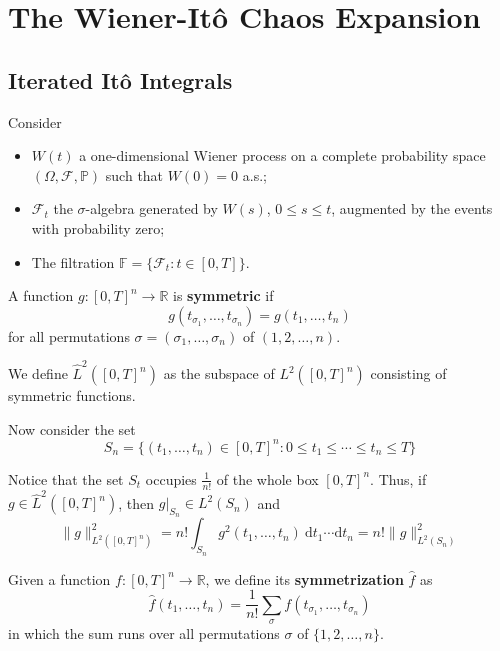 \chapter{The Wiener-Itô Chaos Expansion}

\section{Iterated Itô Integrals}

Consider

\begin{itemize}
\item
  \(W(t)\) a one-dimensional Wiener process on a complete probability
  space \((\Omega, \mathcal{F}, \mathbb{P})\) such that \(W(0) = 0\)
  a.s.;
\item
  \(\mathcal{F}_t\) the \(\sigma\)-algebra generated by \(W(s)\),
  \(0 \le s \le t\), augmented by the events with probability zero;
\item
  The filtration \(\mathbb{F} = \{ \mathcal{F}_t : t \in [0, T] \}\).
\end{itemize}

\begin{definition}
    A function \(g : [0,T]^n \longrightarrow \mathbb{R}\) is \textbf{symmetric} if
    \[
    g(t_{\sigma_1}, \ldots, t_{\sigma_n}) = g(t_1, \ldots, t_n)
    \]
    for all permutations \(\sigma = (\sigma_1, \ldots, \sigma_n)\) of
    \((1, 2, \ldots, n)\).

    We define \(\hat{L}^2([0,T]^n)\) as the subspace of \(L^2([0,T]^n)\)
    consisting of symmetric functions.
\end{definition}

Now consider the set
\[
S_n = \{ (t_1, \ldots, t_n) \in [0, T]^n : 0 \le t_1 \le \cdots \le t_n \le T \}
\]

Notice that the set \(S_t\) occupies \(\frac{1}{n!}\) of the whole box
\([0,T]^n\). Thus, if \(g \in \hat{L}^2([0,T]^n)\), then
\(g|_{S_n} \in L^2(S_n)\) and
\[
\| g \|_{L^2([0,T]^n)}^2 = n! \int_{S_n} g^2(t_1, \ldots, t_n) ~\mathrm{d} t_1 \cdots \mathrm{d}t_n = n! \| g \|_{L^2(S_n)}^2
\]

\begin{definition}
    Given a function \(f : [0,T]^n \longrightarrow \mathbb{R}\), we define its
    \textbf{symmetrization} \(\hat{f}\) as
    \[
    \hat{f}(t_1, \ldots, t_n) = \frac{1}{n!} \sum_{\sigma} f(t_{\sigma_1}, \ldots, t_{\sigma_n})
    \]
    in which the sum runs over all permutations \(\sigma\) of \(\{ 1, 2, \ldots, n \}\).
\end{definition}


